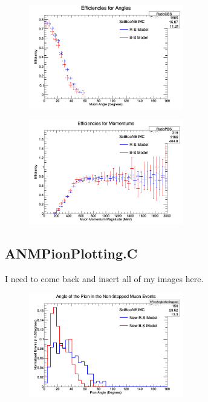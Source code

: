 \documentclass[11pt]{article}
\begin{document}
\begin{figure}[H]
\centering
\includegraphics[width=0.6\textwidth]{ANMCombinedPlotsImages/17-ANMCombinedPlots.png}
\caption{}
\end{figure}

\begin{figure}[H]
\centering
\includegraphics[width=0.6\textwidth]{ANMCombinedPlotsImages/18-ANMCombinedPlots.png}
\caption{}
\end{figure}

\subsection{ANMPionPlotting.C}
I need to come back and insert all of my images here.

\begin{figure}[H]
\centering
\includegraphics[width=0.6\textwidth]{ANMPionPlottingImages/1-ANMPionPlotting.png}
\caption{}
\end{figure}
\end{document}
